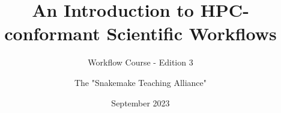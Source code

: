 \documentclass[english,xcolor=pdftex,dvipsnames]{beamer}
\title[Introduction to Workflow Programming]{An Introduction to HPC-conformant Scientific Workflows}
\subtitle{Workflow Course - Edition 3}
\author[Snakemake Teaching Alliance]{The "Snakemake Teaching Alliance"}
\date{September 2023}
\begin{document}

\begin{frame}[plain] %
  \titlepage
\end{frame}










           

       

       







      
    
      
%

%

%




\end{document}
